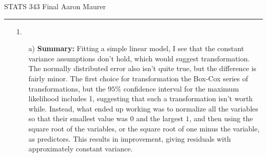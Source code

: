 \documentclass[11pt]{article}
\theoremstyle{definition}
\begin{document}
STATS 343 Final \hfill Aaron Maurer
\vspace{2mm}
\hrule
\vspace{2mm}

\begin{itemize}
    \item[1.]
        \begin{itemize}
            \item[a)]
                {\bf Summary:} Fitting a simple linear model, I see that the constant variance assumptions don't hold, which would suggest transformation. The normally distributed error also isn't quite true, but the difference is fairly minor. The first choice for transformation the Box-Cox series of transformations, but the $95\%$ confidence interval for the maximum likelihood includes 1, suggesting that such a transformation isn't worth while. Instead, what ended up working was to normalize all the variables so that their smallest value was $0$ and the largest $1$, and then using the square root of the variables, or the square root of one minus the variable, as predictors. This results in improvement, giving residuals with approximately constant variance. \par


\end{itemize}
\end{itemize}
\end{document}
